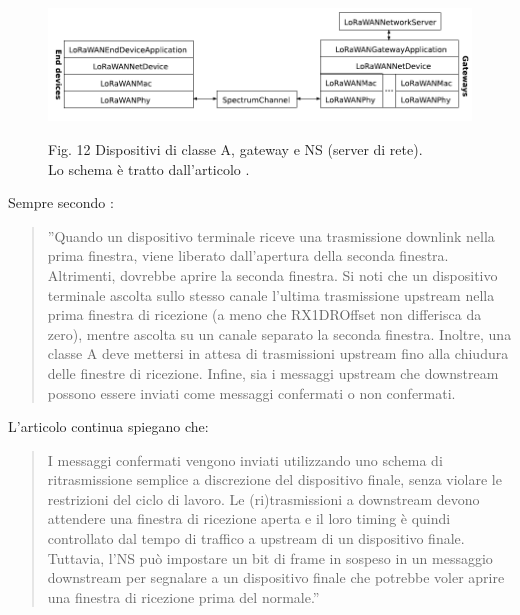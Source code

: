 \documentclass[a4paper]{report} %
\begin{document}
\begin{figure}
\centering
\includegraphics[scale=.5]{Immagini/ClasseA.png}

Fig. 12 Dispositivi di classe A, gateway e NS (server di rete). \\
Lo schema è tratto dall'articolo \cite{art:rif.49}. \\
\end{figure}

Sempre secondo \cite{art:rif.49}:
\begin{quote}
	''Quando un dispositivo terminale riceve una trasmissione downlink nella prima finestra, viene liberato dall'apertura della seconda finestra. Altrimenti, dovrebbe aprire la seconda finestra. Si noti che un dispositivo terminale ascolta sullo stesso canale l'ultima trasmissione upstream nella prima finestra di ricezione (a meno che RX1DROffset non differisca da zero), mentre ascolta su un canale separato la seconda finestra. Inoltre, una classe A deve mettersi in attesa di trasmissioni upstream fino alla chiudura delle finestre di ricezione. Infine, sia i messaggi upstream che downstream possono essere inviati come messaggi confermati o non confermati. 
\end{quote}
L'articolo continua spiegano che:
\begin{quote}	
	I messaggi confermati vengono inviati utilizzando uno schema di ritrasmissione semplice a discrezione del dispositivo finale, senza violare le restrizioni del ciclo di lavoro. Le (ri)trasmissioni a downstream devono attendere una finestra di ricezione aperta e il loro timing è quindi controllato dal tempo di traffico a upstream di un dispositivo finale. Tuttavia, l'NS può impostare un bit di frame in sospeso in un messaggio downstream per segnalare a un dispositivo finale che potrebbe voler aprire una finestra di ricezione prima del normale.''
\end{quote}
\end{document}
